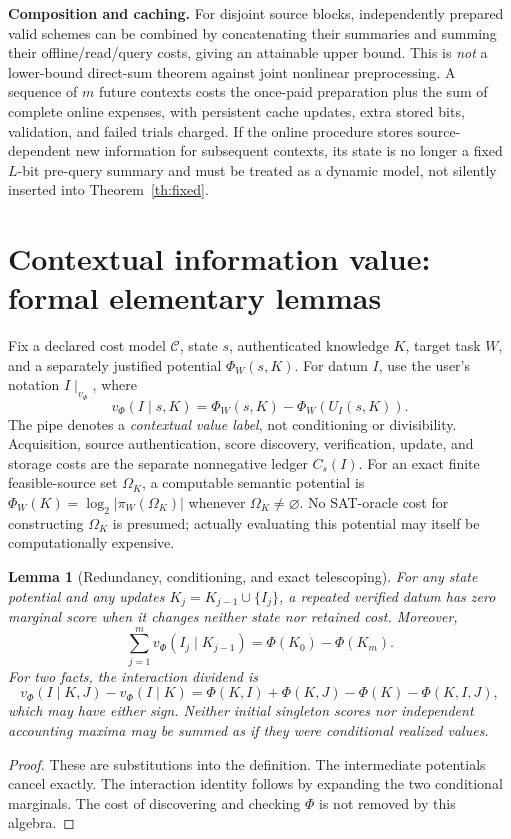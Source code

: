 \documentclass[10pt]{article}
\newtheorem{lemma}[theorem]{Lemma}
\begin{document}
\noindent\textbf{Composition and caching.} For disjoint source blocks, independently prepared valid schemes can be combined by concatenating their summaries and summing their offline/read/query costs, giving an attainable upper bound. This is \emph{not} a lower-bound direct-sum theorem against joint nonlinear preprocessing. A sequence of $m$ future contexts costs the once-paid preparation plus the sum of complete online expenses, with persistent cache updates, extra stored bits, validation, and failed trials charged. If the online procedure stores source-dependent new information for subsequent contexts, its state is no longer a fixed $L$-bit pre-query summary and must be treated as a dynamic model, not silently inserted into Theorem~\ref{th:fixed}.

\section{Contextual information value: formal elementary lemmas}\label{sec:value}
Fix a declared cost model $\mathcal C$, state $s$, authenticated knowledge $K$, target task $W$, and a separately justified potential $\Phi_W(s,K)$. For datum $I$, use the user's notation $I\mid_{v_\Phi}$, where
\[
 v_\Phi(I\mid s,K)=\Phi_W(s,K)-\Phi_W(U_I(s,K)).
\]
The pipe denotes a \emph{contextual value label}, not conditioning or divisibility. Acquisition, source authentication, score discovery, verification, update, and storage costs are the separate nonnegative ledger $C_s(I)$. For an exact finite feasible-source set $\Omega_K$, a computable semantic potential is $\Phi_W(K)=\log_2|\pi_W(\Omega_K)|$ whenever $\Omega_K\ne\varnothing$. No SAT-oracle cost for constructing $\Omega_K$ is presumed; actually evaluating this potential may itself be computationally expensive.

\begin{lemma}[Redundancy, conditioning, and exact telescoping]
For any state potential and any updates $K_j=K_{j-1}\cup\{I_j\}$, a repeated verified datum has zero marginal score when it changes neither state nor retained cost. Moreover,
\[
 \sum_{j=1}^m v_\Phi(I_j\mid K_{j-1})=\Phi(K_0)-\Phi(K_m).
\]
For two facts, the interaction dividend is
\[
 v_\Phi(I\mid K,J)-v_\Phi(I\mid K)=
 \Phi(K,I)+\Phi(K,J)-\Phi(K)-\Phi(K,I,J),
\]
which may have either sign. Neither initial singleton scores nor independent accounting maxima may be summed as if they were conditional realized values.
\end{lemma}
\begin{proof}These are substitutions into the definition. The intermediate potentials cancel exactly. The interaction identity follows by expanding the two conditional marginals. The cost of discovering and checking $\Phi$ is not removed by this algebra.\end{proof}
\end{document}
